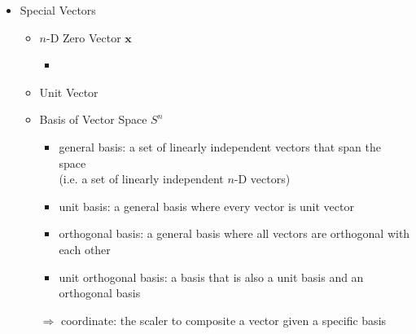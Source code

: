 \begin{itemize}
\item Special Vectors
	\begin{itemize}
	\item $n$-D Zero Vector $\mathbf x$
		\begin{itemize}
		\item 
		\end{itemize}
	\item Unit Vector
	\item Basis of Vector Space $S^{n}$
		\begin{itemize}
		\item general basis: a set of linearly independent vectors that span the space \\
		(i.e. a set of linearly independent $n$-D vectors)
		\item unit basis: a general basis where every vector is unit vector
		\item orthogonal basis: a general basis where all vectors are orthogonal with each other
		\item unit orthogonal basis: a basis that is also a unit basis and an orthogonal basis
		\end{itemize}
		$\Rightarrow$ coordinate: the scaler to composite a vector given a specific basis
	\end{itemize}
\end{itemize}

